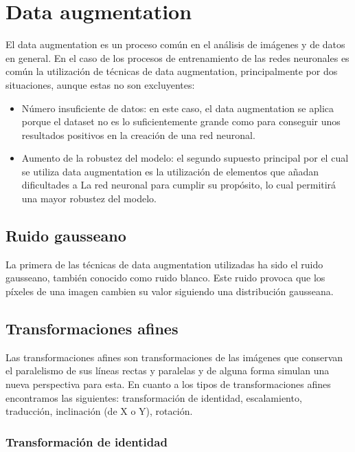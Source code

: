 \section{Data augmentation}

El data augmentation es un proceso común en el análisis de imágenes y de datos en general. En el caso de los procesos de entrenamiento de las redes neuronales es común
la utilización de técnicas de data augmentation, principalmente por dos situaciones, aunque estas no son excluyentes:

\begin{itemize}
	\item Número insuficiente de datos: en este caso, el data augmentation se aplica porque el dataset no es lo suficientemente grande como para conseguir unos resultados 
positivos en la creación de una red neuronal.
	\item Aumento de la robustez del modelo: el segundo supuesto principal por el cual se utiliza data augmentation es la utilización de elementos que añadan dificultades a La
red neuronal para cumplir su propósito, lo cual permitirá una mayor robustez del modelo.
\end{itemize}

\subsection{Ruido gausseano}

La primera de las técnicas de data augmentation utilizadas ha sido el ruido gausseano, también conocido como ruido blanco. Este ruido provoca que los píxeles de una imagen cambien
su valor siguiendo una distribución gausseana.

\subsection{Transformaciones afines}

Las transformaciones afines son transformaciones de las imágenes que conservan el paralelismo de sus líneas rectas y paralelas y de alguna forma simulan una nueva perspectiva para esta.
En cuanto a los tipos de transformaciones afines encontramos las siguientes: transformación de identidad, escalamiento, traducción, inclinación (de X o Y), rotación.

\subsubsection{Transformación de identidad}

